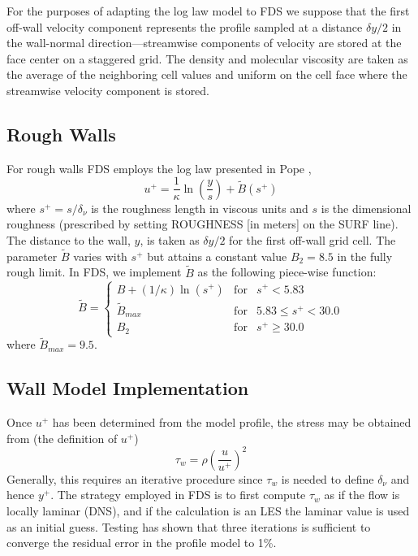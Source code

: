 For the purposes of adapting the log law model to FDS we suppose that the first off-wall velocity component represents the profile sampled at a distance $\delta y/2$ in the wall-normal direction---streamwise components of velocity are stored at the face center on a staggered grid.  The density and molecular viscosity are taken as the average of the neighboring cell values and uniform on the cell face where the streamwise velocity component is stored.

\subsection{Rough Walls}
\label{rough_wall_model}

For rough walls FDS employs the log law presented in Pope \cite{Pope:2000},
\begin{equation}
\label{eqn_roughwallloglaw}
u^+ = \frac{1}{\kappa} \ln \left(\frac{y}{s}\right) + \tilde{B}(s^+)
\end{equation}
where $s^+ = s/\delta_\nu$ is the roughness length in viscous units and $s$ is the dimensional roughness (prescribed by setting {\ct ROUGHNESS} [in meters] on the {\ct SURF} line). The distance to the wall, $y$, is taken as $\delta y/2$ for the first off-wall grid cell.  The parameter $\tilde{B}$ varies with $s^+$ but attains a constant value $B_2=8.5$ in the fully rough limit.  In FDS, we implement $\tilde{B}$ as the following piece-wise function:
\begin{equation}
\tilde{B} = \left\{ \begin{array}{lll} B + (1/\kappa)\ln(s^+)  & \mbox{for} &          s^+ < 5.83 \\
                                       \tilde{B}_{max}         & \mbox{for} & 5.83 \le s^+ < 30.0 \\
                                       B_2                     & \mbox{for} &          s^+ \ge 30.0 \end{array} \right.
\end{equation}
where $\tilde{B}_{max} = 9.5$.

\subsection{Wall Model Implementation}
Once $u^+$ has been determined from the model profile, the stress may be obtained from (the definition of $u^+$)
\begin{equation}
\label{eqn_wall_stress}
\tau_w = \rho \left( \frac{u}{u^+} \right)^2
\end{equation}
Generally, this requires an iterative procedure since $\tau_w$ is needed to define $\delta_\nu$ and hence $y^+$.  The strategy employed in FDS is to first compute $\tau_w$ as if the flow is locally laminar (DNS), and if the calculation is an LES the laminar value is used as an initial guess.  Testing has shown that three iterations is sufficient to converge the residual error in the profile model to 1\%.

